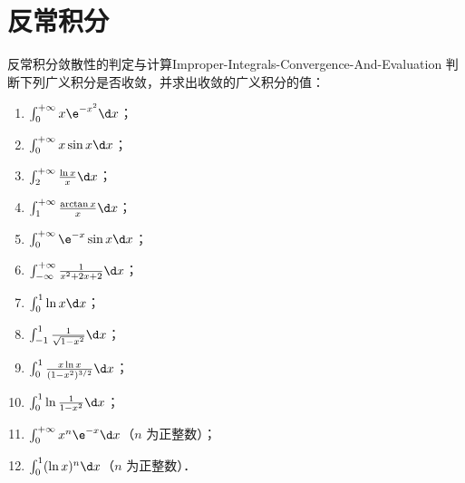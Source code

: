 \section{反常积分}

\begin{problem}{反常积分敛散性的判定与计算}{Improper-Integrals-Convergence-And-Evaluation}
    判断下列广义积分是否收敛，并求出收敛的广义积分的值：
    \begin{enumerate}
        \item $\int_0^{+\infty} x\e^{-x^2} \d x$；
        \item $\int_0^{+\infty} x \sin x \d x$；
        \item $\int_2^{+\infty} \frac{\ln x}{x} \d x$；
        \item $\int_1^{+\infty} \frac{\arctan x}{x} \d x$；
        \item $\int_0^{+\infty} \e^{-x} \sin x \d x$；
        \item $\int_{-\infty}^{+\infty} \frac{1}{x^2 + 2x + 2} \d x$；
        \item $\int_0^1 \ln x \d x$；
        \item $\int_{-1}^1 \frac{1}{\sqrt{1 - x^2}} \d x$；
        \item $\int_0^1 \frac{x \ln x}{(1 - x^2)^{3/2}} \d x$；
        \item $\int_0^1 \ln \frac{1}{1 - x^2} \d x$；
        \item $\int_0^{+\infty} x^n \e^{-x} \d x$（$n$ 为正整数）；
        \item $\int_0^1 (\ln x)^n \d x$（$n$ 为正整数）．
    \end{enumerate}
\end{problem}

